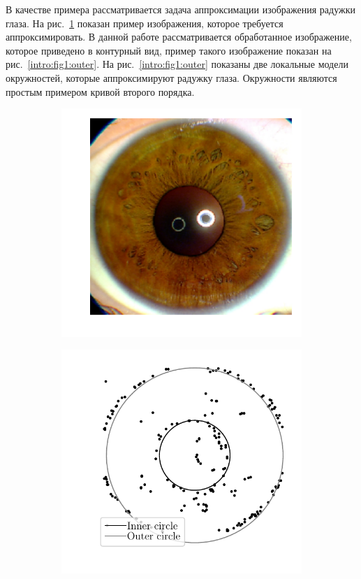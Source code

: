 \documentclass[12pt, twoside]{article}
\numberwithin{equation}{section}
\begin{document}
В качестве примера рассматривается задача аппроксимации изображения радужки глаза. На рис.~\ref{intro:fig1:real} показан пример изображения, которое требуется аппроксимировать. В данной работе рассматривается обработанное изображение, которое приведено в контурный вид, пример такого изображение показан на рис.~\ref{intro:fig1:outer}. На рис.~\ref{intro:fig1:outer} показаны две локальные модели окружностей, которые аппроксимируют радужку глаза. Окружности являются простым примером кривой второго порядка.

\begin{figure}
     \centering
     \begin{subfigure}[b]{0.3\textwidth}
         \centering
         \includegraphics[width=\textwidth]{figures/real_image}
         \caption{}
         \label{intro:fig1:real}
     \end{subfigure}
     \begin{subfigure}[b]{0.3\textwidth}
         \centering
         \includegraphics[width=\textwidth]{figures/outline_image}

\end{subfigure}
\end{figure}
\end{document}
